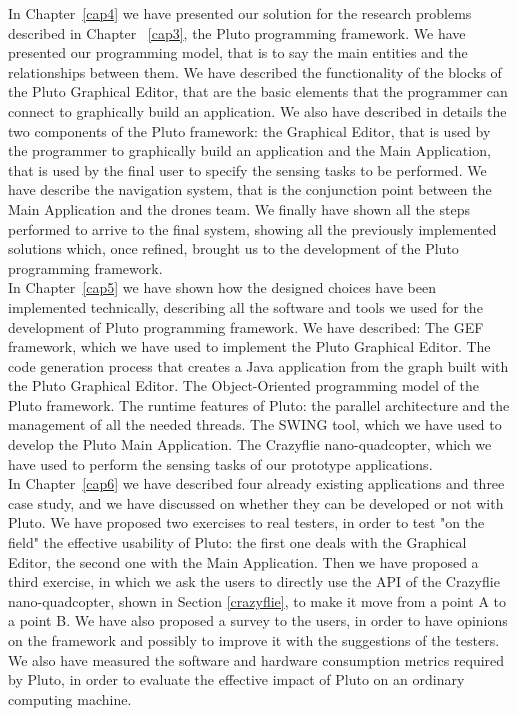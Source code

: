 In Chapter~\ref{cap4} we have presented our solution for the research problems described in Chapter ~\ref{cap3}, the Pluto programming framework.
We have presented our programming model, that is to say the main entities and the relationships between them.
We have described the functionality of the blocks of the Pluto Graphical Editor, that are the basic elements that the programmer can connect to graphically build an application.
We also have described in details the two components of the Pluto framework:
the Graphical Editor, that is used by the programmer to graphically build an application and the Main Application, that is used by the final user to specify the sensing tasks to be performed.
We have describe the navigation system, that is the conjunction point between the Main Application and the drones team.
We finally have shown all the steps performed to arrive to the final system, showing all the previously implemented solutions which, once refined, brought us to the development of the Pluto programming framework.
\\

In Chapter~\ref{cap5} we have shown how the designed choices have been implemented technically, describing all the software and tools we used for the development of Pluto programming framework.
We have described:
The GEF framework, which we have used to implement the Pluto Graphical Editor.
The code generation process that creates a Java application from the graph built with the Pluto Graphical Editor.
The Object-Oriented programming model of the Pluto framework.
The runtime features of Pluto: the parallel architecture and the management of all the needed threads.
The SWING tool, which we have used to develop the Pluto Main Application.
The Crazyflie nano-quadcopter, which we have used to perform the sensing tasks of our prototype applications.
\\

In Chapter~\ref{cap6} we have described four already existing applications and three case study, and we have discussed on whether they can be developed or not with Pluto. 
We have proposed two exercises to real testers, in order to test "on the field" the effective usability of Pluto:
the first one deals with the Graphical Editor, the second one with the Main Application.
Then we have proposed a third exercise, in which we ask the users to directly use the API of the Crazyflie nano-quadcopter, shown in Section \ref{crazyflie}, to make it move from a point A to a point B.
We have also proposed a survey to the users, in order to have opinions on the framework and possibly to improve it with the suggestions of the testers.
We also have measured the software and hardware consumption metrics required by Pluto, in order to evaluate the effective impact of Pluto on an ordinary computing machine.

